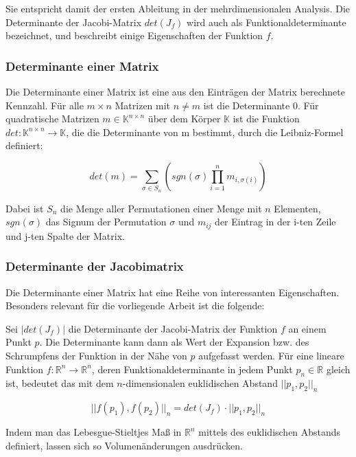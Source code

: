 \documentclass[a4paper,fontsize=12pt,toc=bib,halfparskip,ngerman]{scrartcl}
\begin{document}
Sie entspricht damit der ersten Ableitung in der mehrdimensionalen Analysis. Die Determinante der Jacobi-Matrix $det(J_f)$ wird auch als Funktionaldeterminante bezeichnet, und beschreibt einige Eigenschaften der Funktion $f$. 

\subsubsection{Determinante einer Matrix}
Die Determinante einer Matrix ist eine aus den Eintr\"agen der Matrix berechnete Kennzahl. F\"ur alle $m\times n$ Matrizen mit $n \neq m$ ist die Determinante 0. F\"ur quadratische Matrizen $m \in \mathbb{K}^{n\times n}$ \"uber dem K\"orper $\mathbb{K}$ ist die Funktion $det: \mathbb{K}^{n\times n} \rightarrow \mathbb{K}$, die die Determinante von m bestimmt, durch die Leibniz-Formel definiert:

\begin{equation}
	det(m) = \sum_{\sigma \in S_n} \left( sgn(\sigma) \prod_{i=1}^{n} m_{i,\sigma(i)}\right)
\end{equation}

Dabei ist $S_n$ die Menge aller Permutationen einer Menge mit $n$ Elementen, $sgn(\sigma)$ das Signum der Permutation $\sigma$ und $m_{ij}$ der Eintrag in der i-ten Zeile und j-ten Spalte der Matrix.

\subsubsection{Determinante der Jacobimatrix}
Die Determinante einer Matrix hat eine Reihe von interessanten Eigenschaften. Besonders relevant f\"ur die vorliegende Arbeit ist die folgende:

Sei $|det(J_f)|$ die Determinante der Jacobi-Matrix der Funktion $f$ an einem Punkt $p$. Die Determinante kann dann als Wert der Expansion bzw. des Schrumpfens der Funktion in der N\"ahe von $p$ aufgefasst werden. F\"ur eine lineare Funktion $f: \mathbb{R}^n\rightarrow \mathbb{R}^n$, deren Funktionaldeterminante in jedem Punkt $p_n \in \mathbb{R}$ gleich ist, bedeutet das mit dem $n$-dimensionalen euklidischen Abstand $||p_1, p_2||_n$

\begin{equation}
||f(p_1), f(p_2)||_n = det(J_f)\cdot||p_1, p_2||_n
\end{equation}

Indem man das Lebesgue-Stieltjes Ma{\ss} in $\mathbb{R}^n$ mittels des euklidischen Abstands definiert, lassen sich so Volumen\"anderungen ausdr\"ucken.
\end{document}
